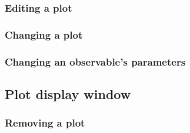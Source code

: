             \subsubsection{Editing a plot}
            \subsubsection{Changing a plot}
            \subsubsection{Changing an observable's parameters}
        
    \subsection{Plot display window}
            \subsubsection{Removing a plot}
        
\fi
